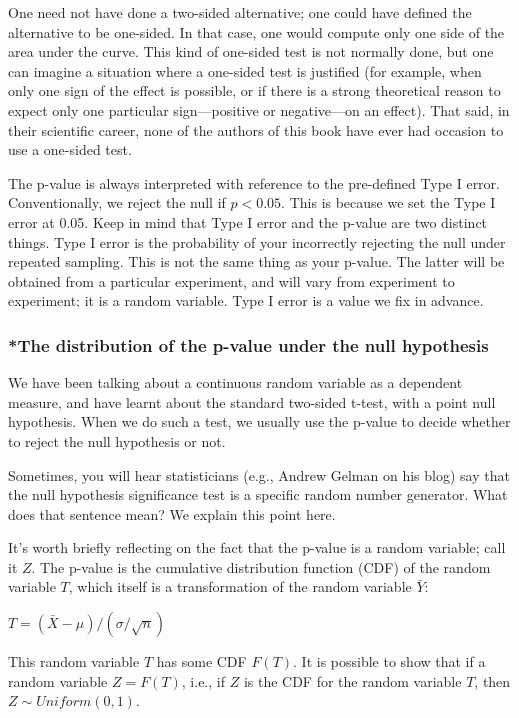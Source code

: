 \documentclass[12pt,]{krantz}
\begin{document}
One need not have done a two-sided alternative; one could have defined the alternative to be one-sided. In that case, one would compute only one side of the area under the curve. This kind of one-sided test is not normally done, but one can imagine a situation where a one-sided test is justified (for example, when only one sign of the effect is possible, or if there is a strong theoretical reason to expect only one particular sign---positive or negative---on an effect). That said, in their scientific career, none of the authors of this book have ever had occasion to use a one-sided test.

The p-value is always interpreted with reference to the pre-defined Type I error. Conventionally, we reject the null if \(p<0.05\). This is because we set the Type I error at 0.05. Keep in mind that Type I error and the p-value are two distinct things.
Type I error is the probability of your incorrectly rejecting the null under repeated sampling. This is not the same thing as your p-value. The latter will be obtained from a particular experiment, and will vary from experiment to experiment; it is a random variable. Type I error is a value we fix in advance.

\hypertarget{the-distribution-of-the-p-value-under-the-null-hypothesis}{%
\subsubsection{*The distribution of the p-value under the null hypothesis}\label{the-distribution-of-the-p-value-under-the-null-hypothesis}}

We have been talking about a continuous random variable as a dependent measure, and have learnt about the standard two-sided t-test, with a point null hypothesis. When we do such a test, we usually use the p-value to decide whether to reject the null hypothesis or not.

Sometimes, you will hear statisticians (e.g., Andrew Gelman on his blog) say that the null hypothesis significance test is a specific random number generator. What does that sentence mean? We explain this point here.

It's worth briefly reflecting on the fact that the p-value is a random variable; call it \(Z\). The p-value is the cumulative distribution function (CDF) of the random variable \(T\), which itself is a transformation of the random variable \(\bar{Y}\):

\(T=(\bar{X}-\mu)/(\sigma/\sqrt{n})\)

This random variable \(T\) has some CDF \(F(T)\). It is possible to show that if a random variable \(Z=F(T)\), i.e., if \(Z\) is the
CDF for the random variable \(T\), then \(Z \sim Uniform(0,1)\).
\end{document}
